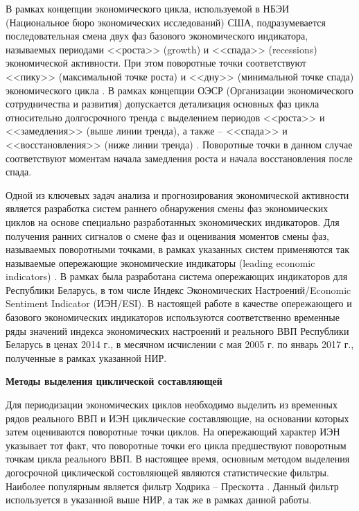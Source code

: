 \documentclass[a4paper,14pt]{extreport}
\begin{document}
	В рамках концепции экономического цикла, используемой в НБЭИ (Национальное бюро экономических исследований) США, подразумевается последовательная смена двух фаз базового экономического индикатора, называемых периодами <<роста>> (growth)  и <<спада>> (recessions) экономической активности. При этом поворотные точки соответствуют <<пику>> (максимальной точке роста) и <<дну>> (минимальной точке спада) экономического цикла \cite{nberDevelopment}.  В рамках концепции ОЭСР (Организации экономического сотрудничества и развития) допускается  детализация основных фаз цикла относительно долгосрочного тренда с выделением периодов <<роста>> и <<замедления>> (выше линии тренда), а также  -- <<спада>> и <<восстановления>>  (ниже линии тренда) \cite{oecdCycleExtraction}. Поворотные точки в данном случае соответствуют моментам начала замедления роста и начала восстановления после спада. 
	
	Одной из ключевых задач анализа и прогнозирования экономической активности является разработка систем раннего обнаружения смены фаз экономических циклов на основе специально разработанных экономических индикаторов. Для получения ранних сигналов о смене фаз и оценивания моментов смены фаз, называемых поворотными точками, в рамках указанных систем применяются так называемые опережающие экономические индикаторы (leading economic indicators) \cite{oecdCLI}. В рамках \cite{esiMaking,esiMakingAlt,esiExtra} была разработана система опережающих индикаторов для Республики Беларусь, в том числе Индекс Экономических Настроений/Economic Sentiment Indicator (ИЭН/ESI). В настоящей работе в качестве опережающего и базового экономических индикаторов используются соответственно временные ряды значений индекса экономических настроений и реального ВВП Республики Беларусь в ценах 2014 г., в месячном исчислении с мая 2005 г. по январь 2017 г., полученные в рамках указанной НИР.
	
	\bigskip
	\textbf{Методы выделения циклической составляющей}
	
	Для периодизации экономических циклов необходимо выделить из временных рядов реального ВВП и ИЭН циклические составляющие, на основании которых затем оцениваются поворотные точки циклов. На опережающий характер ИЭН указывает тот факт, что поворотные точки его цикла предшествуют поворотным точкам цикла реального ВВП. В настоящее время, основным методом выделения догосрочной циклической состовляющей являются статистические фильтры. Наиболее популярным является фильтр Ходрика -- Прескотта \cite{oecdCycleExtraction,estrellaFilterDo}. Данный фильтр используется в указанной выше НИР, а так же в рамках данной работы. 
	
\end{document}
